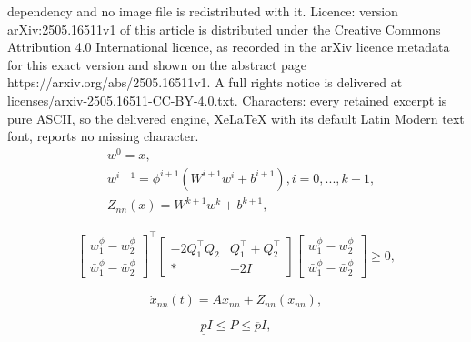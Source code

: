 \documentclass[10pt,a4paper]{amsart}
\begin{document}
dependency and no image file is redistributed with it. Licence: version arXiv:2505.16511v1 of this article is distributed under the Creative Commons Attribution 4.0 International licence, as recorded in the arXiv licence metadata for this exact version and shown on the abstract page https://arxiv.org/abs/2505.16511v1. A full rights notice is delivered at licenses/arxiv-2505.16511-CC-BY-4.0.txt. Characters: every retained excerpt is pure ASCII, so the delivered engine, XeLaTeX with its default Latin Modern text font, reports no missing character.
\begin{equation}\label{NN}
 \begin{aligned}
&w^0=x,
\\&w^{i+1}=\phi^{i+1}(W^{i+1}w^{i}+b^{i+1}), i=0,...,k-1,
\\&Z_{nn}(x)=W^{k+1}w^{k}+b^{k+1},
\end{aligned}
\end{equation}

\begin{equation}\label{LEM1}
 \begin{aligned}
\begin{bmatrix}
w_1^{\phi}-w_2^{\phi}
 \\
\bar{w}_1^{\phi}-\bar{w}_2^{\phi}
\end{bmatrix}^\top \begin{bmatrix}
 -2Q_1^\top Q_2&Q_1^{\top}+Q_2^\top
 \\
\ast&-2I
\end{bmatrix}\begin{bmatrix}
w_1^{\phi}-w_2^{\phi}
 \\
\bar{w}_1^{\phi}-\bar{w}_2^{\phi}
\end{bmatrix}\geq 0, 
\end{aligned}
\end{equation}

 \begin{equation}\label{NDL}
\dot{x}_{nn}(t)=Ax_{nn}+Z_{nn}(x_{nn}), 
\end{equation}

\begin{equation}\label{TH110}
 \underline{p}I\leq P\leq \overline{p}I, 
\end{equation}
\end{document}
